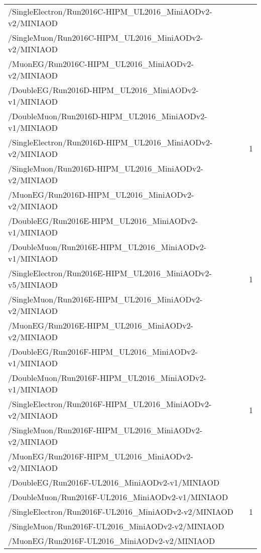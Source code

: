 \begin{table}[h]
\begin{tabular}{|lc|}
        /SingleElectron/Run2016C-HIPM\_UL2016\_MiniAODv2-v2/MINIAOD	& \\
        /SingleMuon/Run2016C-HIPM\_UL2016\_MiniAODv2-v2/MINIAOD	& \\
        /MuonEG/Run2016C-HIPM\_UL2016\_MiniAODv2-v2/MINIAOD	& \\
        \hline
        /DoubleEG/Run2016D-HIPM\_UL2016\_MiniAODv2-v1/MINIAOD & \multirow{5}{*}{1} \\ %
        /DoubleMuon/Run2016D-HIPM\_UL2016\_MiniAODv2-v1/MINIAOD	& \\
        /SingleElectron/Run2016D-HIPM\_UL2016\_MiniAODv2-v2/MINIAOD	& \\
        /SingleMuon/Run2016D-HIPM\_UL2016\_MiniAODv2-v2/MINIAOD	& \\
        /MuonEG/Run2016D-HIPM\_UL2016\_MiniAODv2-v2/MINIAOD	& \\
        \hline
        /DoubleEG/Run2016E-HIPM\_UL2016\_MiniAODv2-v1/MINIAOD & \multirow{5}{*}{1} \\ %
        /DoubleMuon/Run2016E-HIPM\_UL2016\_MiniAODv2-v1/MINIAOD	& \\
        /SingleElectron/Run2016E-HIPM\_UL2016\_MiniAODv2-v5/MINIAOD	& \\
        /SingleMuon/Run2016E-HIPM\_UL2016\_MiniAODv2-v2/MINIAOD	& \\
        /MuonEG/Run2016E-HIPM\_UL2016\_MiniAODv2-v2/MINIAOD	& \\
        \hline
        /DoubleEG/Run2016F-HIPM\_UL2016\_MiniAODv2-v1/MINIAOD & \multirow{5}{*}{1} \\ %
        /DoubleMuon/Run2016F-HIPM\_UL2016\_MiniAODv2-v1/MINIAOD	& \\
        /SingleElectron/Run2016F-HIPM\_UL2016\_MiniAODv2-v2/MINIAOD	& \\
        /SingleMuon/Run2016F-HIPM\_UL2016\_MiniAODv2-v2/MINIAOD	& \\
        /MuonEG/Run2016F-HIPM\_UL2016\_MiniAODv2-v2/MINIAOD	& \\
        \hline
        /DoubleEG/Run2016F-UL2016\_MiniAODv2-v1/MINIAOD & \multirow{5}{*}{1} \\ %
        /DoubleMuon/Run2016F-UL2016\_MiniAODv2-v1/MINIAOD	& \\
        /SingleElectron/Run2016F-UL2016\_MiniAODv2-v2/MINIAOD	& \\
        /SingleMuon/Run2016F-UL2016\_MiniAODv2-v2/MINIAOD	& \\
        /MuonEG/Run2016F-UL2016\_MiniAODv2-v2/MINIAOD	& \\

\end{tabular}
\end{table}
